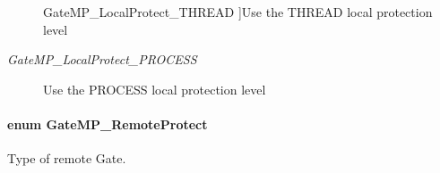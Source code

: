 \begin{Desc}
\begin{description}
{Gate\-M\-P\-\_\-\-Local\-Protect\-\_\-\-T\-H\-R\-E\-A\-D\label{_gate_m_p_8h_a3877bd64627d7449d3687e8b06939652a257bc8d4b8d6d19bdbe96cae37cbd908}
}]Use the T\-H\-R\-E\-A\-D local protection level \item[{\em 
Gate\-M\-P\-\_\-\-Local\-Protect\-\_\-\-P\-R\-O\-C\-E\-S\-S\label{_gate_m_p_8h_a3877bd64627d7449d3687e8b06939652aeec868d37052043812bc4c1829319a6d}
}]Use the P\-R\-O\-C\-E\-S\-S local protection level \end{description}
\end{Desc}

\paragraph[{Gate\-M\-P\-\_\-\-Remote\-Protect}]{\setlength{\rightskip}{0pt plus 5cm}enum {\bf Gate\-M\-P\-\_\-\-Remote\-Protect}}\label{_gate_m_p_8h_a88716d5706d8fa8c6a3b9a4f023ef1d8}


Type of remote Gate. 

